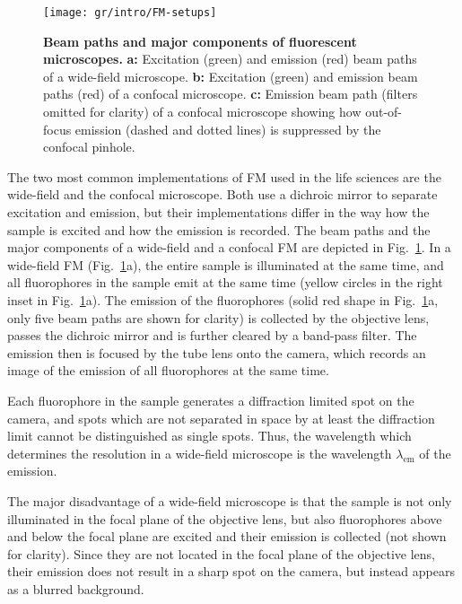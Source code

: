 \begin{figure}
  \texttt{[image: gr/intro/FM-setups]}
  \caption{\textbf{Beam paths and major components of fluorescent
      microscopes.} \textbf{a:} Excitation (green) and emission (red) beam
    paths of a wide-field microscope. \textbf{b:} Excitation (green) and
    emission beam paths (red) of a confocal microscope.  \textbf{c:} Emission
    beam path (filters omitted for clarity) of a confocal microscope showing
    how out-of-focus emission (dashed and dotted lines) is suppressed by the
    confocal pinhole.}
  \label{fig:FM-setups}
\end{figure}

The two most common implementations of FM used in the life sciences are the
wide-field and the confocal microscope. Both use a dichroic mirror to separate
excitation and emission, but their implementations differ in the way how the
sample is excited and how the emission is recorded. The beam paths and the
major components of a wide-field and a confocal FM are depicted in
Fig.~\ref{fig:FM-setups}. In a wide-field FM (Fig.~\ref{fig:FM-setups}a), the
entire sample is illuminated at the same time, and all fluorophores in the sample
emit at the same time (yellow circles in the right inset in
Fig.~\ref{fig:FM-setups}a). The emission of the fluorophores (solid red shape
in Fig.~\ref{fig:FM-setups}a, only five beam paths are shown for clarity) is
collected by the objective lens, passes the dichroic mirror and is further
cleared by a band-pass filter. The emission then is focused by the tube lens
onto the camera, which records an image of the emission of all fluorophores at
the same time.

Each fluorophore in the sample generates a diffraction limited spot on the
camera, and spots which are not separated in space by at least the diffraction limit
cannot be distinguished as single spots. Thus, the wavelength which determines
the resolution in a wide-field microscope is the wavelength $\lambda_\text{em}$
of the emission.

The major disadvantage of a wide-field microscope is that the sample is not
only illuminated in the focal plane of the objective lens, but also
fluorophores above and below the focal plane are excited and their
emission is collected (not shown for clarity). Since they are not located in
the focal plane of the objective lens, their emission does not result in a
sharp spot on the camera, but instead appears as a blurred background.    

